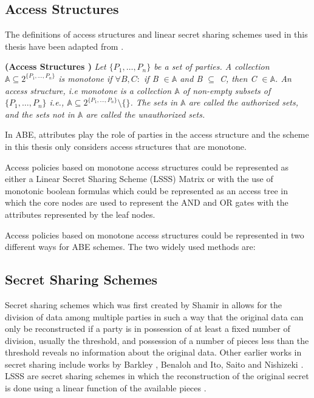 \subsection{Access Structures}

The definitions of access structures and linear secret sharing schemes used in this thesis have been adapted from \cite{Beimel1996}.

\begin{definition}{\textbf{(Access Structures \cite{Beimel1996})}}
	\textit{Let $\{P_{1},\ldots,P_{n}\}$ be a set of parties. A collection $ \mathbb{A} \subseteq 2^{\{P_{1},\ldots,P_{n}\}} $ is monotone if $ \forall B,C\colon $ if B $ \in \mathbb{A} $ and B $ \subseteq $ C, then C $ \in \mathbb{A} $. An access structure, i.e monotone is a collection $ \mathbb{A} $ of non-empty subsets of $\{P_{1},\ldots,P_{n}\}$ i.e., $ \mathbb{A} \subseteq 2^{\{P_{1},\ldots,P_{n}\}}\setminus\{\} $. The sets in $ \mathbb{A} $ are called the authorized sets, and the sets not in $ \mathbb{A} $ are called the unauthorized sets.}
\end{definition}

In ABE, attributes play the role of parties in the access structure and the scheme in this thesis only considers access structures that are monotone. 

Access policies based on monotone access structures could be represented as either a Linear Secret Sharing Scheme (LSSS) Matrix or with the use of monotonic boolean formulas which could be represented as an access tree in which the core nodes are used to represent the AND and OR gates with the attributes represented by the leaf nodes. 

Access policies based on monotone access structures could be represented in two different ways for ABE schemes. The two widely used methods are:

\subsection{Secret Sharing Schemes}

Secret sharing schemes which was first created by Shamir in \cite{Shamir1979} allows for the division of data among multiple parties in such a way that the original data can only be reconstructed if a party is in possession of at least a fixed number of division, usually the threshold, and possession of a number of pieces less than the threshold reveals no information about the original data. Other earlier works in secret sharing include works by Barkley \cite{Blakley1979}, Benaloh \cite{Benaloh1988} and Ito, Saito and Nishizeki \cite{Ito1989}. LSSS are secret sharing schemes in which the reconstruction of the original secret is done using a linear function of the available pieces \cite{Beimel1996}.

